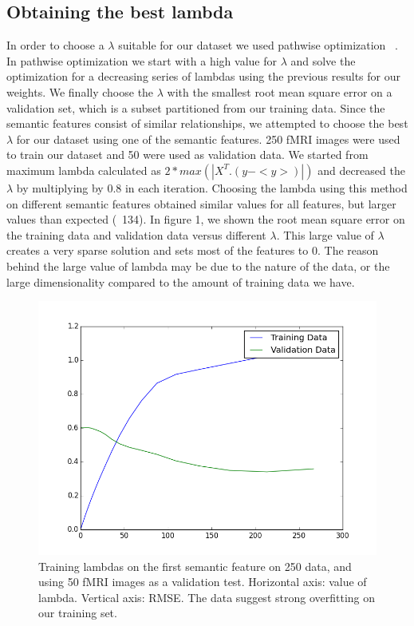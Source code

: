 \documentclass{article} %
\begin{document}
\subsection{Obtaining the best lambda}
In order to choose a $\lambda$ suitable for our dataset we used pathwise optimization ~\cite{friedman2010regularization}. In pathwise optimization we start with a high value for  $\lambda$ and solve the optimization for a decreasing series of lambdas using the previous results for our weights. We finally choose the $\lambda$ with the smallest root mean square error on a validation set, which is a subset partitioned from our training data. Since the semantic features consist of similar relationships, we attempted to choose the best $\lambda$ for our dataset using one of the semantic features. 250 fMRI images were used to train our dataset and 50 were used as validation data. We started from maximum lambda calculated as $2 * max (|X^T.(y - <y>)|)$ and decreased the $\lambda$ by multiplying by 0.8 in each iteration. Choosing the lambda using this method on different semantic features obtained similar values for all features, but larger values than expected (~134). In figure 1, we shown the root mean square error on the training data and validation data versus different $\lambda$. This large value of $\lambda$ creates a very sparse solution and sets most of the features to 0. The reason behind the large value of lambda may be due to the nature of the data, or the large dimensionality compared to the amount of training data we have.



\begin{figure}[h]
\begin{center}
\includegraphics[scale=0.5]{trainvalidlambda.png}
\end{center}
\caption{Training lambdas on the first semantic feature on 250 data, and using 50 fMRI
images as a validation test. Horizontal axis: value of lambda. Vertical axis: RMSE. The data suggest strong overfitting on our training set.}
\end{figure}
\end{document}

